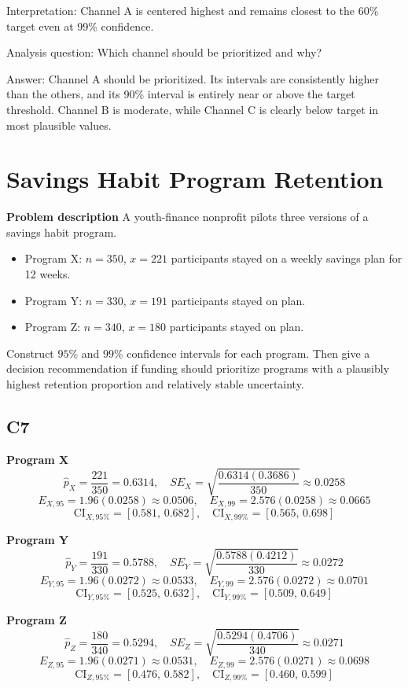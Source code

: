 	Interpretation: Channel A is centered highest and remains closest to the 60\% target even at 99\% confidence.
	
	Analysis question: Which channel should be prioritized and why?
	
	Answer: Channel A should be prioritized. Its intervals are consistently higher than the others, and its 90\% interval is entirely near or above the target threshold. Channel B is moderate, while Channel C is clearly below target in most plausible values.
	
	\section{Savings Habit Program Retention}
	\textbf{Problem description}
	A youth-finance nonprofit pilots three versions of a savings habit program.
	\begin{itemize}
		\item Program X: \(n=350\), \(x=221\) participants stayed on a weekly savings plan for 12 weeks.
		\item Program Y: \(n=330\), \(x=191\) participants stayed on plan.
		\item Program Z: \(n=340\), \(x=180\) participants stayed on plan.
	\end{itemize}
	Construct \(95\%\) and \(99\%\) confidence intervals for each program. Then give a decision recommendation if funding should prioritize programs with a plausibly highest retention proportion and relatively stable uncertainty.
	
	\subsection*{C7}
	\textbf{Program X}
	\[
	\hat p_X=\frac{221}{350}=0.6314,
	\quad SE_X=\sqrt{\frac{0.6314(0.3686)}{350}}\approx 0.0258
	\]
	\[
	E_{X,95}=1.96(0.0258)\approx 0.0506,
	\quad E_{X,99}=2.576(0.0258)\approx 0.0665
	\]
	\[
	\text{CI}_{X,95\%}=[0.581,\,0.682],
	\quad \text{CI}_{X,99\%}=[0.565,\,0.698]
	\]
	
	\textbf{Program Y}
	\[
	\hat p_Y=\frac{191}{330}=0.5788,
	\quad SE_Y=\sqrt{\frac{0.5788(0.4212)}{330}}\approx 0.0272
	\]
	\[
	E_{Y,95}=1.96(0.0272)\approx 0.0533,
	\quad E_{Y,99}=2.576(0.0272)\approx 0.0701
	\]
	\[
	\text{CI}_{Y,95\%}=[0.525,\,0.632],
	\quad \text{CI}_{Y,99\%}=[0.509,\,0.649]
	\]
	
	\textbf{Program Z}
	\[
	\hat p_Z=\frac{180}{340}=0.5294,
	\quad SE_Z=\sqrt{\frac{0.5294(0.4706)}{340}}\approx 0.0271
	\]
	\[
	E_{Z,95}=1.96(0.0271)\approx 0.0531,
	\quad E_{Z,99}=2.576(0.0271)\approx 0.0698
	\]
	\[
	\text{CI}_{Z,95\%}=[0.476,\,0.582],
	\quad \text{CI}_{Z,99\%}=[0.460,\,0.599]
	\]
	
